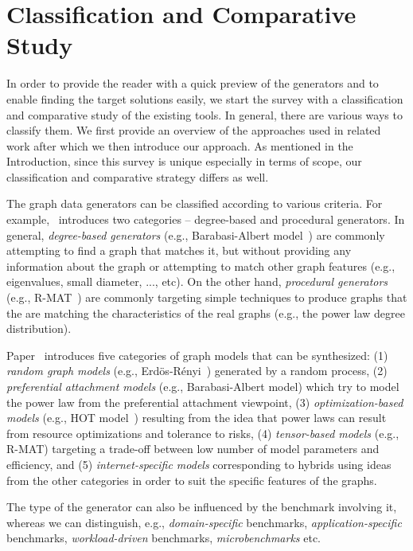\section{Classification and Comparative Study}
\label{sec:comparison}

In order to provide the reader with a quick preview of the generators and  to enable finding the target solutions easily, we start the survey with a  classification and comparative study of the existing tools. In general, there are various ways to classify them. We first provide an overview of the approaches used in related work after which we then introduce our approach. As mentioned in the Introduction, since this survey is unique especially in terms of scope, our classification and comparative strategy differs as well.

The graph data generators can be classified according to various criteria. For example,~\cite{DBLP:conf/sdm/ChakrabartiZF04} introduces two categories -- degree-based and procedural generators. In general, \emph{degree-based generators} (e.g., Barabasi-Albert model~\cite{Barabasi99emergenceScaling}) are commonly attempting to find a graph that matches it, but without providing any information about the graph or attempting to match other graph features (e.g., eigenvalues, small diameter, ..., etc). On the other hand, \emph{procedural generators} (e.g., R-MAT~\cite{DBLP:conf/sdm/ChakrabartiZF04}) are commonly targeting simple techniques to produce graphs that the are matching the characteristics of the real graphs (e.g., the power law degree distribution).

Paper~\cite{Chakrabarti:2006:GML:1132952.1132954} introduces five categories of graph models that can be synthesized: (1) \emph{random graph models} (e.g., Erd\"{o}s-R\'{e}nyi~\cite{Erdos:1960}) generated by a random process, (2) \emph{preferential attachment models} (e.g., Barabasi-Albert model) which try to model the power law from the preferential attachment viewpoint, (3) \emph{optimization-based models} (e.g., HOT model~\cite{PhysRevLett.84.2529}) resulting from the idea that power laws can result from resource optimizations and tolerance to risks, (4) \emph{tensor-based models} (e.g., R-MAT) targeting a trade-off between low number of model parameters and efficiency, and (5) \emph{internet-specific models} corresponding to hybrids using ideas from the other categories in order to suit the specific features of the graphs.

The type of the generator can also be influenced by the benchmark involving it, whereas we can distinguish, e.g., \emph{domain-specific} benchmarks, \emph{application-specific} benchmarks, \emph{workload-driven} benchmarks,  \emph{microbenchmarks} etc.


